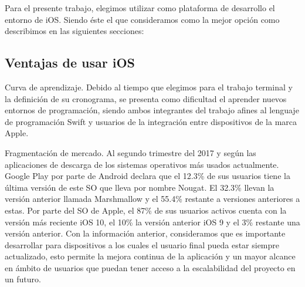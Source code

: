 		Para el presente trabajo, elegimos utilizar como plataforma de desarrollo el entorno de iOS. Siendo éste el que consideramos como la mejor opción como describimos en las siguientes secciones:
		
	\subsection{Ventajas de usar iOS}

	Curva de aprendizaje.
	Debido al tiempo que elegimos para el trabajo terminal y la definición de su cronograma, se presenta como dificultad el aprender nuevos entornos de programación, siendo ambos integrantes del trabajo afines al lenguaje de programación Swift y usuarios de la integración entre dispositivos de la marca Apple.
	
	Fragmentación de mercado.
	Al segundo trimestre del 2017 y según las aplicaciones de descarga de los sistemas operativos más usados actualmente. Google Play por parte de Android declara que el 12.3\% de sus usuarios tiene la última versión de este SO que lleva por nombre Nougat. El 32.3\% llevan la versión anterior llamada Marshmallow y el 55.4\% restante a versiones anteriores a estas. Por parte del SO de Apple, el 87\% de sus usuarios activos cuenta con la versión más reciente iOS 10, el 10\% la versión anterior iOS 9 y el 3\% restante una versión anterior.
	Con la información anterior, consideramos que es importante desarrollar para dispositivos a los cuales el usuario final pueda estar siempre actualizado, esto permite la mejora continua de la aplicación y un mayor alcance en ámbito de usuarios que puedan tener acceso a la escalabilidad del proyecto en un futuro.
